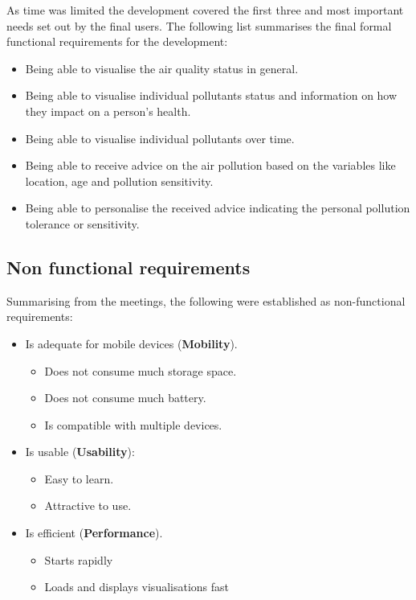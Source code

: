 As time was limited the development covered the first three and most important needs set out by the final users. The following list summarises the final formal functional requirements for the development:

\begin{itemize}
    \item Being able to visualise the air quality status in general.
    \item Being able to visualise individual pollutants status and information on how they impact on a person's health.
    \item Being able to visualise individual pollutants over time.
    \item Being able to receive advice on the air pollution based on the variables like location, age and pollution sensitivity. 
    \item Being able to personalise the received advice indicating the personal pollution tolerance or sensitivity.
\end{itemize}

\subsection{Non functional requirements}

Summarising from the meetings, the following were established as non-functional requirements:

\begin{itemize}
    \item Is adequate for mobile devices (\textbf{Mobility}).
    \begin{itemize}
        \item Does not consume much storage space.
        \item Does not consume much battery.
        \item Is compatible with multiple devices.
    \end{itemize}
    \item Is usable (\textbf{Usability}):
    \begin{itemize}
        \item Easy to learn.
        \item Attractive to use.
    \end{itemize}
    \item Is efficient (\textbf{Performance}).
    \begin{itemize}
        \item Starts rapidly
        \item Loads and displays visualisations fast
    \end{itemize}
\end{itemize}


